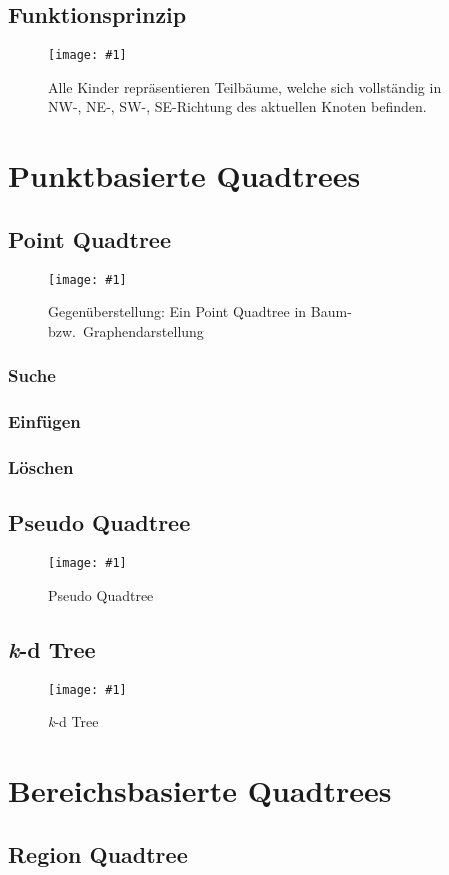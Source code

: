 \documentclass[%
			paper=a4,%
			DIV12, %
			draft=false,%
			titlepage
			]{scrartcl}
\newcommand{\myfig}[4] {
 \begin{figure}
	 \texttt{[image: \#1]}
	 \caption{#4}
	 \label{fig:#2}
 \end{figure}
}
\begin{document}
\subsection{Funktionsprinzip}

\myfig{img/quadtree}{quadtree}{width=.5\textwidth}{Alle Kinder repräsentieren Teilbäume, welche sich vollständig in NW-, NE-, SW-, SE-Richtung des aktuellen Knoten befinden.}


\section{Punktbasierte Quadtrees}
\subsection{Point Quadtree}
\myfig{img/pointquadtree-ins7+tree-trimmed}{pointquadtree}{width=.9\textwidth}{Gegenüberstellung: Ein Point Quadtree in Baum- bzw.\ Graphendarstellung}

\subsubsection{Suche}
\subsubsection{Einfügen}
\subsubsection{Löschen}

\subsection{Pseudo Quadtree}
\myfig{img/pseudoquadtree-ins3-trimmed}{pseudoquadtree}{width=.6\textwidth}{Pseudo Quadtree}

\subsection{\textit{k}-d Tree}
\myfig{img/kdtree-tree-full-trimmed}{kdtree}{width=.8\textwidth}{\textit{k}-d Tree}

\section{Bereichsbasierte Quadtrees}
\subsection{Region Quadtree}
\end{document}

